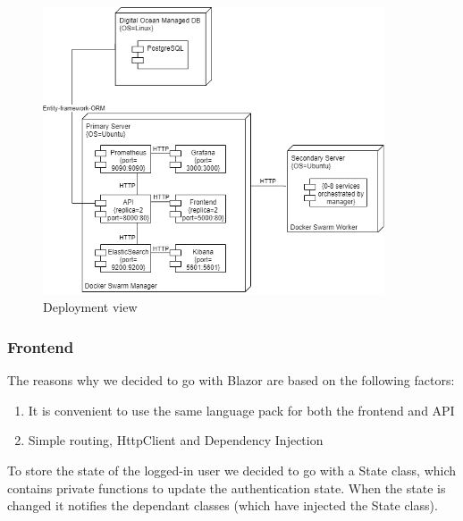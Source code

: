 \documentclass[10pt]{article}
\begin{document}
\begin{figure} [H]
  \centering
  \includegraphics[width=0.9\textwidth]{images/devops-deployment.png}
  \caption{Deployment view}
  \label{fig:deloy}
\end{figure}

\subsubsection{Frontend}
\label{frontenddisc}

The reasons why we decided to go with Blazor are based on the following factors:
\begin{enumerate}
\item It is convenient to use the same language pack for both the frontend and API
\item Simple routing, HttpClient and Dependency Injection
\end{enumerate}

To store the state of the logged-in user we decided to go with a State class, which contains private functions to update the authentication state. When the state is changed it notifies the dependant classes (which have injected the State class). 
\end{document}
